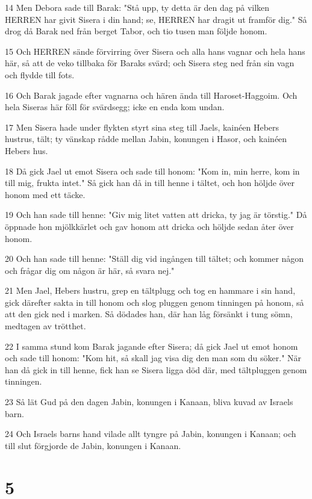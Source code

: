 \par 14 Men Debora sade till Barak: "Stå upp, ty detta är den dag på vilken HERREN har givit Sisera i din hand; se, HERREN har dragit ut framför dig." Så drog då Barak ned från berget Tabor, och tio tusen man följde honom.
\par 15 Och HERREN sände förvirring över Sisera och alla hans vagnar och hela hans här, så att de veko tillbaka för Baraks svärd; och Sisera steg ned från sin vagn och flydde till fots.
\par 16 Och Barak jagade efter vagnarna och hären ända till Haroset-Haggoim. Och hela Siseras här föll för svärdsegg; icke en enda kom undan.
\par 17 Men Sisera hade under flykten styrt sina steg till Jaels, kainéen Hebers hustrus, tält; ty vänskap rådde mellan Jabin, konungen i Hasor, och kainéen Hebers hus.
\par 18 Då gick Jael ut emot Sisera och sade till honom: "Kom in, min herre, kom in till mig, frukta intet." Så gick han då in till henne i tältet, och hon höljde över honom med ett täcke.
\par 19 Och han sade till henne: "Giv mig litet vatten att dricka, ty jag är törstig." Då öppnade hon mjölkkärlet och gav honom att dricka och höljde sedan åter över honom.
\par 20 Och han sade till henne: "Ställ dig vid ingången till tältet; och kommer någon och frågar dig om någon är här, så svara nej."
\par 21 Men Jael, Hebers hustru, grep en tältplugg och tog en hammare i sin hand, gick därefter sakta in till honom och slog pluggen genom tinningen på honom, så att den gick ned i marken. Så dödades han, där han låg försänkt i tung sömn, medtagen av trötthet.
\par 22 I samma stund kom Barak jagande efter Sisera; då gick Jael ut emot honom och sade till honom: "Kom hit, så skall jag visa dig den man som du söker." När han då gick in till henne, fick han se Sisera ligga död där, med tältpluggen genom tinningen.
\par 23 Så lät Gud på den dagen Jabin, konungen i Kanaan, bliva kuvad av Israels barn.
\par 24 Och Israels barns hand vilade allt tyngre på Jabin, konungen i Kanaan; och till slut förgjorde de Jabin, konungen i Kanaan.

\chapter{5}

